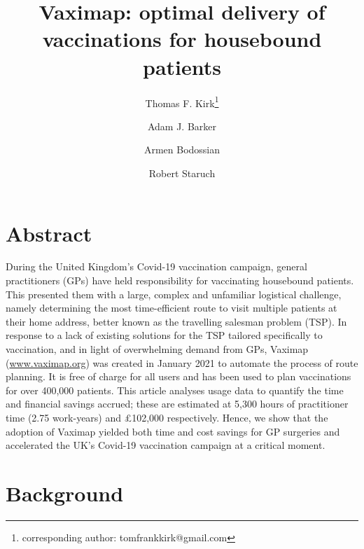\documentclass{article}
\def\vm{Vaximap}
\begin{document}
\title{\textbf{\vm{}{}: optimal delivery of vaccinations for housebound patients}}
\author[1]{Thomas F. Kirk\thanks{corresponding author: tomfrankkirk@gmail.com}}
\author[2]{Adam J. Barker}
\author[3]{Armen Bodossian}
\author[1,4]{Robert Staruch}
\maketitle

\doublespacing
\linenumbers

\section{Abstract}

During the United Kingdom’s Covid-19 vaccination campaign, general practitioners (GPs) have held responsibility for vaccinating housebound patients. This presented them with a large, complex and unfamiliar logistical challenge, namely determining the most time-efficient route to visit multiple patients at their home address, better known as the travelling salesman problem (TSP). In response to a lack of existing solutions for the TSP tailored specifically to vaccination, and in light of overwhelming demand from GPs, Vaximap (\url{www.vaximap.org}) was created in January 2021 to automate the process of route planning. It is free of charge for all users and has been used to plan vaccinations for over 400,000 patients. This article analyses usage data to quantify the time and financial savings accrued; these are estimated at 5,300 hours of practitioner time (2.75 work-years) and £102,000 respectively. Hence, we show that the adoption of Vaximap yielded both time and cost savings for GP surgeries and accelerated the UK’s Covid-19 vaccination campaign at a critical moment.

\section{Background}
\label{sec:background}
\end{document}
